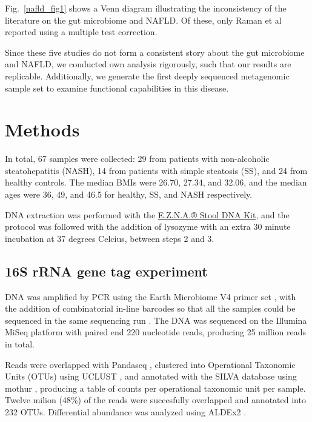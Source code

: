 Fig.~\ref{nafld_fig1} shows a Venn diagram illustrating the inconsistency of the literature on the gut microbiome and NAFLD. Of these, only Raman et al \cite{raman2013fecal} reported using a multiple test correction.

Since these five studies do not form a consistent story about the gut microbiome and NAFLD, we conducted own analysis rigorously, such that our results are replicable. Additionally, we generate the first deeply sequenced metagenomic sample set to examine functional capabilities in this disease.

\FloatBarrier

\section{Methods}
In total, 67 samples were collected: 29 from patients with non-alcoholic steatohepatitis (NASH), 14 from patients with simple steatosis (SS), and 24 from healthy controls. The median BMIs were 26.70, 27.34, and 32.06, and the median ages were 36, 49, and 46.5 for healthy, SS, and NASH respectively.

DNA extraction was performed with the \href{http://omegabiotek.com/store/product/stool-dna-kit/}{E.Z.N.A.® Stool DNA Kit}, and the protocol was followed with the addition of lysozyme with an extra 30 minute incubation at 37 degrees Celcius, between steps 2 and 3.

\subsection{16S rRNA gene tag experiment}

DNA was amplified by PCR using the Earth Microbiome V4 primer set \cite{caporaso2012ultra}, with the addition of combinatorial in-line barcodes so that all the samples could be sequenced in the same sequencing run \cite{gloor2010microbiome}. The DNA was sequenced on the Illumina MiSeq platform with paired end 220 nucleotide reads, producing 25 million reads in total.

Reads were overlapped with Pandaseq \cite{masella2012pandaseq}, clustered into Operational Taxonomic Units (OTUs) using UCLUST \cite{edgar2010search}, and annotated with the SILVA database \cite{quast2013silva} using mothur \cite{schloss2009introducing}, producing a table of counts per operational taxonomic unit per sample. Twelve milion (48\%) of the reads were succesfully overlapped and annotated into 232 OTUs. Differential abundance was analyzed using ALDEx2 \cite{fernandes2014unifying}.

